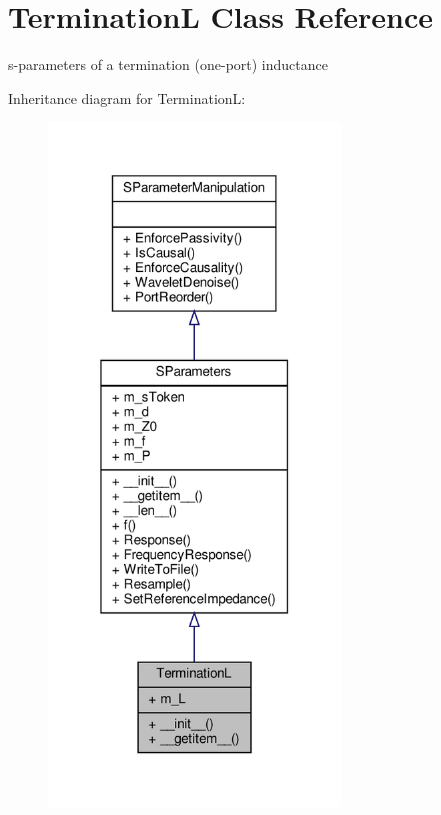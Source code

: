 \hypertarget{classSignalIntegrity_1_1SParameters_1_1Devices_1_1TerminationL_1_1TerminationL}{}\section{TerminationL Class Reference}
\label{classSignalIntegrity_1_1SParameters_1_1Devices_1_1TerminationL_1_1TerminationL}


s-\/parameters of a termination (one-\/port) inductance  




Inheritance diagram for TerminationL\+:
\nopagebreak
\begin{figure}[H]
\begin{center}
\leavevmode
\includegraphics[width=220pt]{classSignalIntegrity_1_1SParameters_1_1Devices_1_1TerminationL_1_1TerminationL__inherit__graph}
\end{center}
\end{figure}


